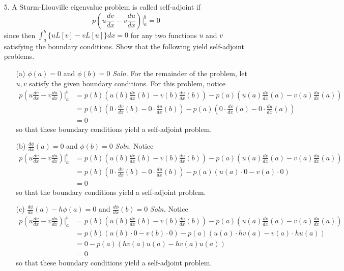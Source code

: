 \documentclass{article}
\begin{document}
\begin{itemize}
    \pagebreak
    \item[5.] A Sturm-Liouville eigenvalue problem is called self-adjoint if 
    \[p\left(u\frac{dv}{dx} - v\frac{du}{dx}\right)\bigg|_a^b = 0\]
    since then $\int_a^b \{uL[v] - vL[u]\}dx = 0$ for any two functions $u$ and $v$ satisfying the boundary conditions. Show that the following yield self-adjoint problems.
    \begin{itemize}
        \item[(a)] $\phi(a) = 0$ and $\phi(b) = 0$
        \newline\newline
        \textit{Soln.} For the remainder of the problem, let $u, v$ satisfy the given boundary conditions. For this problem, notice
        \begin{align*}
            p\left(u\frac{dv}{dx} - v\frac{du}{dx}\right)\bigg|_a^b &= p(b)\left(u(b)\frac{dv}{dx}(b) - v(b)\frac{du}{dx}(b)\right) - p(a)\left(u(a)\frac{dv}{dx}(a) - v(a)\frac{du}{dx}(a)\right)\\
            &= p(b)\left(0\cdot\frac{dv}{dx}(b) - 0\cdot\frac{du}{dx}(b)\right) - p(a)\left(0\cdot\frac{dv}{dx}(a) - 0\cdot \frac{du}{dx}(a)\right)\\
            &= 0
        \end{align*}
        so that these boundary conditions yield a self-adjoint problem.

        \item[(b)] $\frac{d\phi}{dx}(a) = 0$ and $\phi(b) = 0$
        \newline\newline
        \textit{Soln.} Notice
        \begin{align*}
            p\left(u\frac{dv}{dx} - v\frac{du}{dx}\right)\bigg|_a^b &= p(b)\left(u(b)\frac{dv}{dx}(b) - v(b)\frac{du}{dx}(b)\right) - p(a)\left(u(a)\frac{dv}{dx}(a) - v(a)\frac{du}{dx}(a)\right)\\
            &= p(b)\left(0\cdot \frac{dv}{dx}(b) - 0\cdot \frac{du}{dx}(b)\right) - p(a) \left(u(a)\cdot 0 - v(a)\cdot 0\right)\\
            &= 0
        \end{align*}
        so that the boundary conditions yield a self-adjoint problem.

        \item[(c)] $\frac{d\phi}{dx}(a) - h\phi(a) = 0$ and $\frac{d\phi}{dx}(b) = 0$
        \newline\newline
        \textit{Soln.} Notice
        \begin{align*}
            p\left(u\frac{dv}{dx} - v\frac{du}{dx}\right)\bigg|_a^b &= p(b)\left(u(b)\frac{dv}{dx}(b) - v(b)\frac{du}{dx}(b)\right) - p(a)\left(u(a)\frac{dv}{dx}(a) - v(a)\frac{du}{dx}(a)\right)\\
            &= p(b)\left(u(b)\cdot 0 - v(b)\cdot 0\right) - p(a) \left(u(a)\cdot hv(a) - v(a) \cdot hu(a)\right)\\
            &= 0 - p(a)(hv(a)u(a) - hv(a)u(a))\\
            &= 0
        \end{align*}
        so that these boundary conditions yield a self-adjoint problem.
        


\end{itemize}
\end{itemize}
\end{document}
